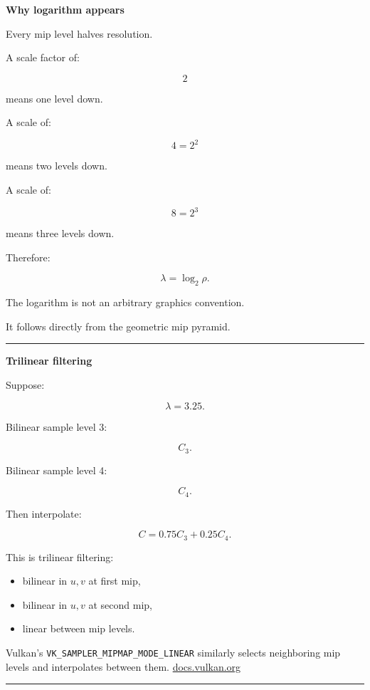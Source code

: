 \textbf{Why logarithm appears}

Every mip level halves resolution.

A scale factor of:

\[
2
\]

means one level down.

A scale of:

\[
4=2^2
\]

means two levels down.

A scale of:

\[
8=2^3
\]

means three levels down.

Therefore:

\[
\lambda=\log_2\rho.
\]

The logarithm is not an arbitrary graphics convention.

It follows directly from the geometric mip pyramid.

\begin{center}\rule{0.5\linewidth}{0.5pt}\end{center}

\textbf{Trilinear filtering}

Suppose:

\[
\lambda=3.25.
\]

Bilinear sample level 3:

\[
C_3.
\]

Bilinear sample level 4:

\[
C_4.
\]

Then interpolate:

\[
\boxed{
C=
0.75C_3+0.25C_4.
}
\]

This is trilinear filtering:

\begin{itemize}
\tightlist
\item
  bilinear in \(u,v\) at first mip,
\item
  bilinear in \(u,v\) at second mip,
\item
  linear between mip levels.
\end{itemize}

Vulkan's \texttt{VK\_SAMPLER\_MIPMAP\_MODE\_LINEAR} similarly selects neighboring mip levels and interpolates between them. \href{https://docs.vulkan.org/tutorial/latest/09_Generating_Mipmaps.html?utm_source=chatgpt.com}{docs.vulkan.org}

\begin{center}\rule{0.5\linewidth}{0.5pt}\end{center}

